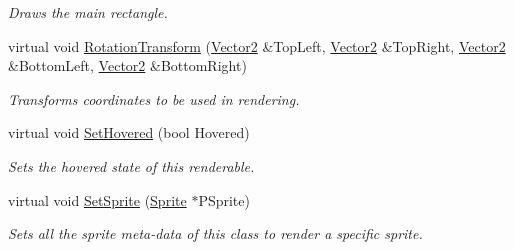 \begin{DoxyCompactItemize}
\begin{DoxyCompactList}\small\item\em Draws the main rectangle. \item\end{DoxyCompactList}\item 
\hypertarget{classMezzanine_1_1UI_1_1Rectangle_ae326bafaa0b801e0fb801fb4c229fc83}{
virtual void \hyperlink{classMezzanine_1_1UI_1_1Rectangle_ae326bafaa0b801e0fb801fb4c229fc83}{RotationTransform} (\hyperlink{classMezzanine_1_1Vector2}{Vector2} \&TopLeft, \hyperlink{classMezzanine_1_1Vector2}{Vector2} \&TopRight, \hyperlink{classMezzanine_1_1Vector2}{Vector2} \&BottomLeft, \hyperlink{classMezzanine_1_1Vector2}{Vector2} \&BottomRight)}
\label{classMezzanine_1_1UI_1_1Rectangle_ae326bafaa0b801e0fb801fb4c229fc83}

\begin{DoxyCompactList}\small\item\em Transforms coordinates to be used in rendering. \item\end{DoxyCompactList}\item 
\hypertarget{classMezzanine_1_1UI_1_1Rectangle_a408bbcbdc321f48b4cbbfef427410596}{
virtual void \hyperlink{classMezzanine_1_1UI_1_1Rectangle_a408bbcbdc321f48b4cbbfef427410596}{SetHovered} (bool Hovered)}
\label{classMezzanine_1_1UI_1_1Rectangle_a408bbcbdc321f48b4cbbfef427410596}

\begin{DoxyCompactList}\small\item\em Sets the hovered state of this renderable. \item\end{DoxyCompactList}\item 
\hypertarget{classMezzanine_1_1UI_1_1Rectangle_a205de435ea7020b58a4c9a2dc538ce25}{
virtual void \hyperlink{classMezzanine_1_1UI_1_1Rectangle_a205de435ea7020b58a4c9a2dc538ce25}{SetSprite} (\hyperlink{structMezzanine_1_1UI_1_1Sprite}{Sprite} $\ast$PSprite)}
\label{classMezzanine_1_1UI_1_1Rectangle_a205de435ea7020b58a4c9a2dc538ce25}

\begin{DoxyCompactList}\small\item\em Sets all the sprite meta-\/data of this class to render a specific sprite. \item\end{DoxyCompactList}\end{DoxyCompactItemize}
